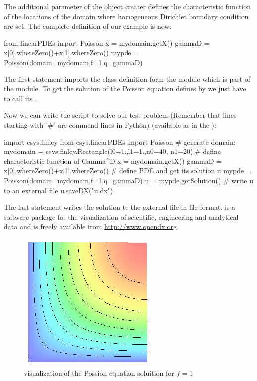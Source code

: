 The additional parameter  of the \Poisson object creater defines the 
characteristic function  of the locations
of the domain where homogeneous Dirichlet boundary condition 
are set. The complete definition of our example is now: 
\begin{python}
from linearPDEs import Poisson
x = mydomain.getX()
gammaD = x[0].whereZero()+x[1].whereZero()
mypde = Poisson(domain=mydomain,f=1,q=gammaD)
\end{python}
The first statement imports the \Poisson class definition form the \linearPDEsPack module which is part of the \escript module.
To get the solution of the Poisson equation defines by  we just have to call its
. 

Now we can write the script to solve our test problem (Remember that
lines starting with '\#' are commend lines in Python) (available as  
in the \ExampleDirectory):
\begin{python}
import esys.finley
from esys.linearPDEs import Poisson
# generate domain:
mydomain = esys.finley.Rectangle(l0=1.,l1=1.,n0=40, n1=20)
# define characteristic function of Gamma^D
x = mydomain.getX()
gammaD = x[0].whereZero()+x[1].whereZero()
# define PDE and get its solution u
mypde = Poisson(domain=mydomain,f=1,q=gammaD)
u = mypde.getSolution()
# write u to an external file
u.saveDX("u.dx")
\end{python}
The last statement writes the solution to the external file  in 
\OpenDX file format. \OpenDX is a software package
for the visualization of scientific, engineering and analytical data and is freely available
from \url{http://www.opendx.org}.

\begin{figure}
\centerline{\includegraphics[width=\figwidth]{FirstStepResult.eps}}
\caption{\OpenDX visualization of the Possion equation soluition for $f=1$}
\label{fig:FirstSteps.3}
\end{figure}

